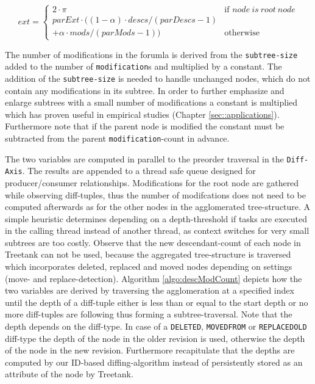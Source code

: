 \begin{equation}
ext = \left\{ \begin{array}{cl}
2 \cdot \pi & \textrm{if }node\ is\ root\ node\\
parExt \cdot ((1-\alpha) \cdot descs / (parDescs - 1) \\+ \alpha \cdot mods / (parMods - 1)) & \textrm{otherwise}\end{array}\right.
\end{equation}

The number of modifications in the forumla is derived from the \texttt{subtree-size} added to the number of \texttt{modification}s and multiplied by a constant. The addition of the \texttt{subtree-size} is needed to handle unchanged nodes, which do not contain any modifications in its subtree. In order to further emphasize and enlarge subtrees with a small number of modifications a constant is multiplied which has proven useful in empirical studies (Chapter \ref{sec::applications}). Furthermore note that if the parent node is modified the constant must be subtracted from the parent \texttt{modification}-count in advance.

The two variables are computed in parallel to the preorder traversal in the \texttt{Diff-Axis}. The results are appended to a thread safe queue designed for producer/consumer relationships. Modifications for the root node are gathered while observing diff-tuples, thus the number of modifcations does not need to be computed afterwards as for the other nodes in the agglomerated tree-structure. A simple heuristic determines depending on a depth-threshold if tasks are executed in the calling thread instead of another thread, as context switches for very small subtrees are too costly. Observe that the new descendant-count of each node in Treetank can not be used, because the aggregated tree-structure is traversed which incorporates deleted, replaced and moved nodes depending on settings (move- and replace-detection). Algorithm \ref{algo:descModCount} depicts how the two variables are derived by traversing the agglomeration at a specified index until the depth of a diff-tuple either is less than or equal to the start depth or no more diff-tuples are following thus forming a subtree-traversal. Note that the depth depends on the diff-type. In case of a \texttt{DELETED}, \texttt{MOVEDFROM} or \texttt{REPLACEDOLD} diff-type the depth of the node in the older revision is used, otherwise the depth of the node in the new revision. Furthermore recapitulate that the depths are computed by our ID-based diffing-algorithm instead of persistently stored as an attribute of the node by Treetank.


